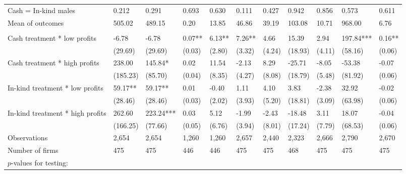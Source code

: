 \documentclass{report}
\begin{document}
\begin{table}[H]
{\begin{tabular}{lllllllllll}
\hspace{1em}\hspace{1em} Cash = In-kind males & 0.212 & 0.291 & 0.693 & 0.630 & 0.111 & 0.427 & 0.942 & 0.856 & 0.573 & 0.611\\
\hspace{1em}Mean of outcomes & 505.02 & 489.15 & 0.20 & 13.85 & 46.86 & 39.19 & 103.08 & 10.71 & 968.00 & 6.76\\
\addlinespace[0.3em]
\multicolumn{11}{l}{\textbf{Panel B: Female sub-sample}}\\
\hspace{1em}Cash treatment * low profits & -6.78 & -6.78 & 0.07** & 6.13** & 7.26** & 4.66 & 15.39 & 2.94 & 197.84*** & 0.16**\\
\hspace{1em} & (29.69) & (29.69) & (0.03) & (2.80) & (3.32) & (4.24) & (18.93) & (4.11) & (58.16) & (0.06)\\
\hspace{1em}Cash treatment * high profits & 238.00 & 145.84* & 0.02 & 11.54 & -2.13 & 8.29 & -25.71 & -8.05 & -53.38 & -0.07\\
\hspace{1em} & (185.23) & (85.70) & (0.04) & (8.35) & (4.27) & (8.08) & (18.79) & (5.48) & (81.92) & (0.06)\\
\hspace{1em}In-kind treatment * low profits & 59.17** & 59.17** & 0.01 & -0.40 & 1.11 & 4.10 & 3.83 & -2.38 & 32.92 & -0.02\\
\hspace{1em} & (28.46) & (28.46) & (0.03) & (2.02) & (3.93) & (5.20) & (18.81) & (3.09) & (63.98) & (0.06)\\
\hspace{1em}In-kind treatment * high profits & 262.60 & 223.24*** & 0.03 & 5.12 & -1.99 & -2.43 & -18.48 & 3.11 & 18.07 & -0.04\\
\hspace{1em} & (166.25) & (77.66) & (0.05) & (6.76) & (3.94) & (8.01) & (17.24) & (7.79) & (68.53) & (0.06)\\
\hspace{1em}Observations & 2,654 & 2,654 & 1,260 & 1,260 & 2,657 & 2,440 & 2,323 & 2,666 & 2,790 & 2,670\\
\hspace{1em}Number of firms & 475 & 475 & 446 & 446 & 475 & 475 & 468 & 475 & 475 & 475\\
\hspace{1em}$p$-values for testing: &  &  &  &  &  &  &  &  &  & \\

\end{tabular}}
\end{table}
\end{document}
